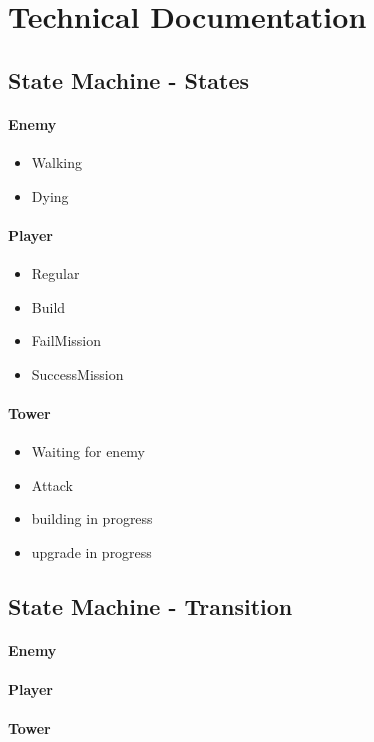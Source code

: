 \documentclass[12pt]{article}
\begin{document}
\section{Technical Documentation}
\subsection{State Machine - States}
\paragraph{Enemy}
\begin{itemize}
	\item Walking
	\item Dying
\end{itemize}

\paragraph{Player}
\begin{itemize}
	\item Regular
	\item Build
	\item FailMission
	\item SuccessMission
\end{itemize}

\paragraph{Tower}
\begin{itemize}
	\item Waiting for enemy
	\item Attack
	\item building in progress
	\item upgrade in progress
\end{itemize}

\subsection{State Machine - Transition}
\paragraph{Enemy}
\paragraph{Player}
\paragraph{Tower}
\end{document}
